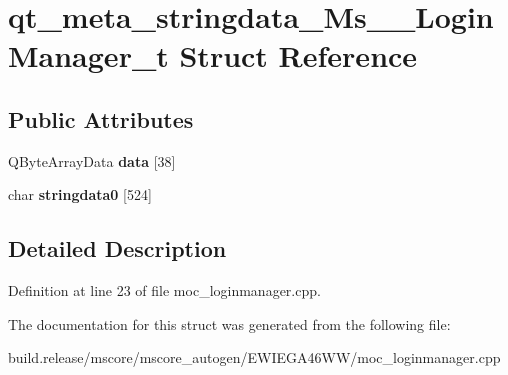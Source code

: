 \hypertarget{structqt__meta__stringdata___ms_____login_manager__t}{}\section{qt\+\_\+meta\+\_\+stringdata\+\_\+\+Ms\+\_\+\+\_\+\+Login\+Manager\+\_\+t Struct Reference}
\label{structqt__meta__stringdata___ms_____login_manager__t}
\subsection*{Public Attributes}
\begin{DoxyCompactItemize}
\item 
\mbox{\label{structqt__meta__stringdata___ms_____login_manager__t_abe1a428228af23ae7e94bdb51560ab59}} 
Q\+Byte\+Array\+Data {\bfseries data} \mbox{[}38\mbox{]}
\item 
\mbox{\label{structqt__meta__stringdata___ms_____login_manager__t_ac13d519ed7d8b3fe8f3ffcb7b822fa5a}} 
char {\bfseries stringdata0} \mbox{[}524\mbox{]}
\end{DoxyCompactItemize}


\subsection{Detailed Description}


Definition at line 23 of file moc\+\_\+loginmanager.\+cpp.



The documentation for this struct was generated from the following file\+:\begin{DoxyCompactItemize}
\item 
build.\+release/mscore/mscore\+\_\+autogen/\+E\+W\+I\+E\+G\+A46\+W\+W/moc\+\_\+loginmanager.\+cpp\end{DoxyCompactItemize}
